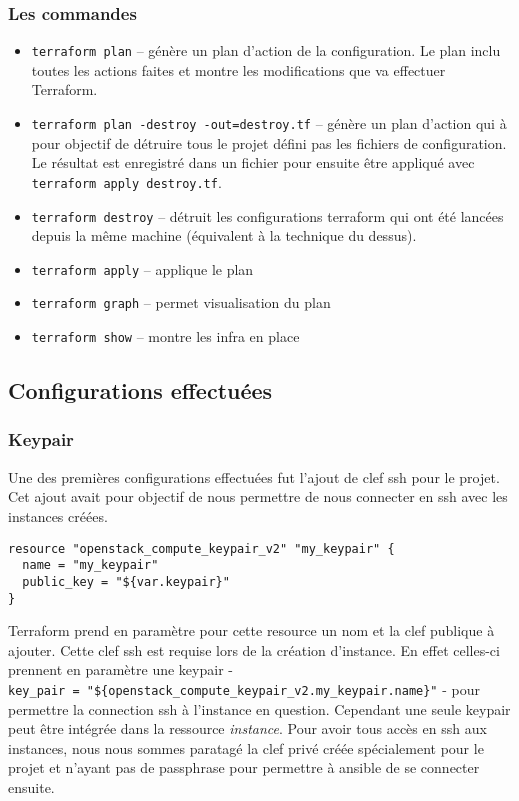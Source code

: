 \documentclass[]{article}
\providecommand{\tightlist}{%
  \setlength{\itemsep}{0pt}\setlength{\parskip}{0pt}}
\begin{document}
\subsubsection{Les commandes}\label{les-commandes}

\begin{itemize}
\tightlist
\item
  \texttt{terraform\ plan} -- génère un plan d'action de la
  configuration. Le plan inclu toutes les actions faites et montre les
  modifications que va effectuer Terraform.
\item
  \texttt{terraform\ plan\ -destroy\ -out=destroy.tf} -- génère un plan
  d'action qui à pour objectif de détruire tous le projet défini pas les
  fichiers de configuration. Le résultat est enregistré dans un fichier
  pour ensuite être appliqué avec \texttt{terraform\ apply\ destroy.tf}.
\item
  \texttt{terraform\ destroy} -- détruit les configurations terraform
  qui ont été lancées depuis la même machine (équivalent à la technique
  du dessus).
\item
  \texttt{terraform\ apply} -- applique le plan
\item
  \texttt{terraform\ graph} -- permet visualisation du plan
\item
  \texttt{terraform\ show} -- montre les infra en place
\end{itemize}

\subsection{Configurations
effectuées}\label{configurations-effectuuxe9es}

\subsubsection{Keypair}\label{keypair}

Une des premières configurations effectuées fut l'ajout de clef ssh pour
le projet. Cet ajout avait pour objectif de nous permettre de nous
connecter en ssh avec les instances créées.

\begin{verbatim}
resource "openstack_compute_keypair_v2" "my_keypair" {
  name = "my_keypair"
  public_key = "${var.keypair}"
}
\end{verbatim}

Terraform prend en paramètre pour cette resource un nom et la clef
publique à ajouter. Cette clef ssh est requise lors de la création
d'instance. En effet celles-ci prennent en paramètre une keypair -
\texttt{key\_pair\ =\ "\$\{openstack\_compute\_keypair\_v2.my\_keypair.name\}"}
- pour permettre la connection ssh à l'instance en question. Cependant
une seule keypair peut être intégrée dans la ressource \emph{instance}.
Pour avoir tous accès en ssh aux instances, nous nous sommes paratagé la
clef privé créée spécialement pour le projet et n'ayant pas de
passphrase pour permettre à ansible de se connecter ensuite.
\end{document}
